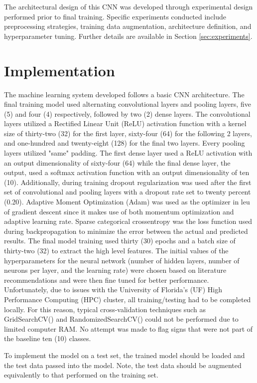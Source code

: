 \documentclass[conference]{IEEEtran}
\begin{document}
The architectural design of this CNN was developed through experimental design performed prior to final training. Specific experiments conducted include preprocessing strategies, training data augmentation, architecture definition, and hyperparameter tuning. Further details are available in Section \ref{sec:experiments}.

\section{Implementation}\label{sec:implementation}
The machine learning system developed follows a basic CNN architecture. The final training model used alternating convolutional layers and  pooling layers, five (5) and four (4) respectively, followed by two (2) dense layers. The convolutional layers utilized a Rectified Linear Unit (ReLU) activation function with a kernel size of thirty-two (32) for the first layer, sixty-four (64) for the following 2 layers, and one-hundred and twenty-eight (128) for the final two layers. Every pooling layers utilized "same" padding. The first dense layer used a ReLU activation with an output dimensionality of sixty-four (64) while the final dense layer, the output, used a softmax activation function with an output dimensionality of ten (10). Additionally, during training dropout regularization was used after the first set of convolutional and pooling layers with a dropout rate set to twenty percent (0.20). Adaptive Moment Optimization (Adam) was used as the optimizer in leu of gradient descent since it makes use of both momentum optimization and adaptive learning rate. Sparse categorical crossentropy was the loss function used during backpropagation to minimize the error between the actual and predicted results. The final model training used thirty (30) epochs and a batch size of thirty-two (32) to extract the high level features. The initial values of the hyperparameters for the neural network (number of hidden layers, number of neurons per layer, and the learning rate) were chosen based on literature recommendations and were then fine tuned for better performance. Unfortunately, due to issues with the University of Florida's (UF) High Performance Computing (HPC) cluster, all training/testing had to be completed locally. For this reason, typical cross-validation techniques such as GridSearchCV() and RandomizedSearchCV() could not be performed due to limited computer RAM. No attempt was made to flag signs that were not part of the baseline ten (10) classes.

To implement the model on a test set, the trained model should be loaded and the test data passed into the model. Note, the test data should be augmented equivalently to that performed on the training set.
\end{document}
